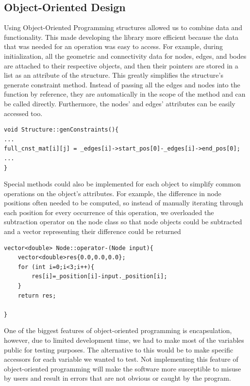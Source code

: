 \subsection{Object-Oriented Design}
Using Object-Oriented Programming structures allowed us to combine data and functionality. This made developing the library more efficient because the data that was needed for an operation was easy to access. For example, during initialization, all the geometric and connectivity data for nodes, edges, and bodes are attached to their respective objects, and then their pointers are stored in a list as an attribute of the structure. This greatly simplifies the structure's generate constraint method. Instead of passing all the edges and nodes into the function by reference, they are automatically in the scope of the method and can be called directly. Furthermore, the nodes' and edges' attributes can be easily accessed too.
\begin{verbatim}
void Structure::genConstraints(){
...
full_cnst_mat[i][j] = _edges[i]->start_pos[0]-_edges[i]->end_pos[0];
...
}
\end{verbatim}

Special methods could also be implemented for each object to simplify common operations on the object's attributes. For example, the difference in node positions often needed to be computed, so instead of manually iterating through each position for every occurrence of this operation, we overloaded the subtraction operator on the node class so that node objects could be subtracted and a vector representing their difference could be returned
\begin{verbatim}
vector<double> Node::operator-(Node input){
    vector<double>res{0.0,0.0,0.0};
    for (int i=0;i<3;i++){
        res[i]=_position[i]-input._position[i];
    }
    return res;

}
\end{verbatim}

One of the biggest features of object-oriented programming is encapsulation, however, due to limited development time, we had to make most of the variables public for testing purposes. The alternative to this would be to make specific accessors for each variable we wanted to test. Not implementing this feature of object-oriented programming will make the software more susceptible to misuse by users and result in errors that are not obvious or caught by the program. 
